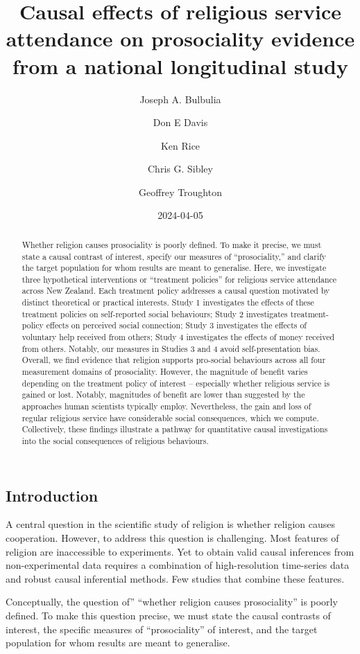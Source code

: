 \documentclass[
  singlecolumn]{article}
\title{Causal effects of religious service attendance on prosociality
evidence from a national longitudinal study}
\author{Joseph A. Bulbulia \and Don E Davis \and Ken Rice \and Chris G.
Sibley \and Geoffrey Troughton}
\date{2024-04-05}
\begin{document}
\maketitle
\begin{abstract}
Whether religion causes prosociality is poorly defined. To make it
precise, we must state a causal contrast of interest, specify our
measures of ``prosociality,'' and clarify the target population for whom
results are meant to generalise. Here, we investigate three hypothetical
interventions or ``treatment policies'' for religious service attendance
across New Zealand. Each treatment policy addresses a causal question
motivated by distinct theoretical or practical interests. Study 1
investigates the effects of these treatment policies on self-reported
social behaviours; Study 2 investigates treatment-policy effects on
perceived social connection; Study 3 investigates the effects of
voluntary help received from others; Study 4 investigates the effects of
money received from others. Notably, our measures in Studies 3 and 4
avoid self-presentation bias. Overall, we find evidence that religion
supports pro-social behaviours across all four measurement domains of
prosociality. However, the magnitude of benefit varies depending on the
treatment policy of interest -- especially whether religious service is
gained or lost. Notably, magnitudes of benefit are lower than suggested
by the approaches human scientists typically employ. Nevertheless, the
gain and loss of regular religious service have considerable social
consequences, which we compute. Collectively, these findings illustrate
a pathway for quantitative causal investigations into the social
consequences of religious behaviours.
\end{abstract}

\subsection{Introduction}\label{introduction}

A central question in the scientific study of religion is whether
religion causes cooperation. However, to address this question is
challenging. Most features of religion are inaccessible to experiments.
Yet to obtain valid causal inferences from non-experimental data
requires a combination of high-resolution time-series data and robust
causal inferential methods. Few studies that combine these features.

Conceptually, the question of'' ``whether religion causes prosociality''
is poorly defined. To make this question precise, we must state the
causal contrasts of interest, the specific measures of ``prosociality''
of interest, and the target population for whom results are meant to
generalise.
\end{document}
